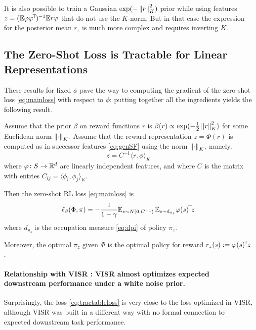 \documentclass[11pt,a4paper]{article}
\begin{document}
\begin{rem}
It
is also possible to train a Gaussian $\exp(-\left\lVert r\right\rVert^2_K)$ prior while
using features $z=(\mathbb{E} \varphi\varphi^{\!\top}\!)^{-1} \mathbb{E} r\varphi$ that do not use the $K$-norm.
But in that case the expression for the posterior mean $r_z$
is much more complex
and requires inverting $K$. %
\end{rem}

\subsection{The Zero-Shot Loss is Tractable for Linear Representations}
\label{sec:lossistractable}

These results for fixed $\phi$ pave the way to
computing the gradient of the zero-shot loss
\eqref{eq:mainloss} with respect to $\phi$: putting together all the
ingredients yields the following result.


\begin{thm}
\label{thm:main}
Assume that the prior $\beta$ on reward functions $r$ is $\beta(r)\propto
\exp(-\tfrac12 \left\lVert r\right\rVert^2_K)$ for some Euclidean norm $\left\lVert\cdot\right\rVert_K$.
Assume that the reward representation $z=\Phi(r)$ is computed as in successor
features \eqref{eq:genSF} using the norm $\left\lVert\cdot\right\rVert_K$, namely,
\begin{equation}
z=C^{-1} \langle r,\phi\rangle_K
\end{equation}
where $\varphi\colon S\to {\mathbb{R}}^d$ are linearly independent features, and where
$C$ is the matrix with entries $C_{ij}= \langle \phi_i,\phi_j\rangle_K$.

Then the zero-shot RL loss \eqref{eq:mainloss} is
\begin{equation}
\label{eq:tractableloss}
\ell_\beta(\Phi,\pi)=-\frac1{1-\gamma} \mathbb{E}_{z\sim N(0,C^{-1})} \,\mathbb{E}_{s\sim
d_{\pi_z}}\varphi(s)^{\!\top}\!z
\end{equation}
where $d_{\pi_z}$ is the occupation measure \eqref{eq:dpi} of policy
$\pi_z$.

Moreover, the optimal $\pi_z$ given $\Phi$ is the optimal policy for
reward $r_z(s)\mathrel{\mathop{:}}= \varphi(s)^{\!\top}\!z$.
\end{thm}




\paragraph{Relationship with VISR \cite{visr}: VISR almost optimizes
expected downstream performance under a white noise prior.} Surprisingly, the loss
\eqref{eq:tractableloss} is very close to the loss optimized in VISR,
although VISR was built in a different way with no formal connection to
expected downstream task performance.
\end{document}
